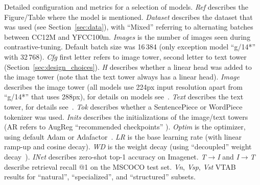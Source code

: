 \begin{table}
\caption{Detailed configuration and metrics for a selection of models. 
\emph{Ref} describes the Figure/Table where the model is mentioned. 
\emph{Dataset} describes the dataset that was used (see Section~\ref{sec:data}), with “Mixed” referring to alternating batches between CC12M and YFCC100m.
\emph{Images} is the number of images seen during contrastive-tuning. Default batch size was 16\,384 (only exception model “g/14*” with 32\,768).
\emph{Cfg} first letter refers to image tower, second letter to text tower (Section~\ref{sec:design_choices}).
\emph{H} describes whether a linear head was added to the image tower (note that the text tower always has a linear head).
\emph{Image} describes the image tower (all models use 224px input resolution apart from “g/14*” that uses 288px), for details on models see~\cite{vit,vitg,dino,mocov3,bit,mixer}.
\emph{Text} describes the text tower, for details see~\cite{vit,bert,T5,mt5}.
\emph{Tok} describes whether a SentencePiece or WordPiece tokenizer was used.
\emph{Inits} describes the initializations of the image/text towers (AR refers to AugReg “recommended checkpoints” \cite{augreg}).
\emph{Optim} is the optimizer, using default Adam or Adafactor~\cite{adafactor}.
\emph{LR} is the base learning rate (with linear ramp-up and cosine decay).
\emph{WD} is the weight decay (using “decoupled” weight decay~\cite{decoupled}).
\emph{INet} describes zero-shot top-1 accuracy on Imagenet.
\emph{T$\rightarrow$I} and \emph{I$\rightarrow$T} describe retrieval recall @1 on the MSCOCO test set.
\emph{Vn}, \emph{Vsp}, \emph{Vst} VTAB~\cite{vtab} results for “natural”, “specialized”, and “structured” subsets.
}
\end{table}